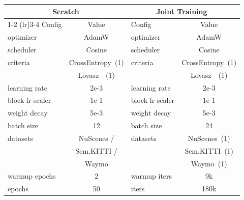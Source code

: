 \begin{tabular}{lclc}\toprule
\multicolumn{2}{c}{Scratch} &\multicolumn{2}{c}{Joint Training~\cite{wu2023ppt}} \\
\cmidrule(lr){1-2} \cmidrule(lr){3-4}
Config &Value &Config &Value \\\midrule
optimizer &AdamW &optimizer &AdamW \\
scheduler &Cosine &scheduler &Cosine \\
criteria &CrossEntropy~(1) &criteria &CrossEntropy~(1) \\
&Lovasz~\cite{berman2018lovasz}~(1) & &Lovasz~\cite{berman2018lovasz}~(1) \\
learning rate &2e-3 &learning rate &2e-3 \\
block lr scaler &1e-1 &block lr scaler &1e-1 \\
weight decay &5e-3 &weight decay &5e-3 \\
batch size &12 &batch size &24 \\
datasets &NuScenes / &datasets &NuScenes~(1) \\
&Sem.KITTI / & &Sem.KITTI~(1) \\
&Waymo & &Waymo~(1) \\
warmup epochs &2 &warmup iters &9k \\
epochs &50 &iters &180k \\
\bottomrule
\end{tabular}
